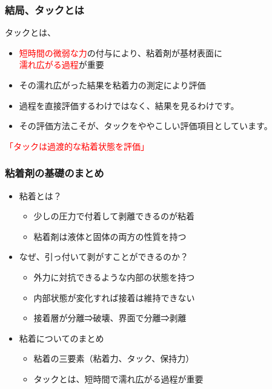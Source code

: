 \documentclass[unicode,12pt]{beamer}%
\begin{document}
\begin{frame}
	\frametitle{結局、タックとは}
	\begin{block}{タックとは、}
		\begin{itemize}
			\item \textcolor{red}{短時間の微弱な力}の付与により、粘着剤が基材表面に\\\textcolor{red}{濡れ広がる過程}が重要
			\item その濡れ広がった\alert{結果を粘着力の測定により評価}
			\item \alert{過程を直接評価するわけではなく、結果を見る}わけです。
			\item その評価方法こそが、タックをややこしい評価項目としています。
		\end{itemize}
		\vspace{5mm}
		\centering
		\textcolor{red}{\large 「タックは過渡的な粘着状態を評価」}
	\end{block}
\end{frame}

\begin{frame}
	\frametitle{粘着剤の基礎のまとめ}
        \begin{boxnote}
            \vspace{-3mm}
            \begin{itemize}
                \item 粘着とは？
                    \begin{itemize}
                        \item 少しの圧力で付着して剥離できるのが粘着
                        \item 粘着剤は液体と固体の両方の性質を持つ
                    \end{itemize} 
                \item なぜ、引っ付いて剥がすことができるのか？
                    \begin{itemize}
                        \item 外力に対抗できるような内部の状態を持つ
                        \item 内部状態が変化すれば接着は維持できない
                        \item 接着層が分離⇒破壊、界面で分離⇒剥離
                    \end{itemize} 
                \item 粘着についてのまとめ
                    \begin{itemize}
                        \item 粘着の三要素（粘着力、タック、保持力）
                        \item タックとは、短時間で濡れ広がる過程が重要
                    \end{itemize}
            \end{itemize}
        \end{boxnote}
\end{frame}
\end{document}
